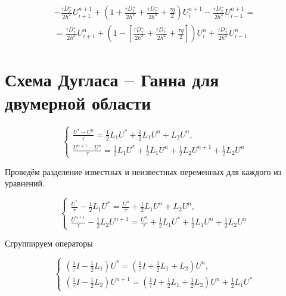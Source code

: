 \documentclass[a4paper,12pt]{article}
\begin{document}
\begin{multline*}
  - \frac{\tau D^+_x}{2h^2}U^{n+1}_{i+1} + \left(1 + \frac{\tau D^+_x}{2 h^2} + \frac{\tau D^-_x}{2 h^2} + \frac{\tau q}{2} \right) U^{n+1}_{i} - \frac{\tau D^-_x}{2h^2}U^{n+1}_{i-1}= \\
  = \frac{\tau D^+_x}{2h^2}U^{n}_{i+1} + \left(1 - \left[ \frac{\tau D^+_x}{2 h^2} + \frac{\tau D^-_x}{2 h^2} + \frac{\tau q}{2} \right] \right) U^{n}_{i} + \frac{\tau D^-_x}{2h^2}U^{n}_{i-1}
\end{multline*}


\section{Схема Дугласа -- Ганна для двумерной области}
\begin{equation}
  \begin{cases}
    \frac{U^* - U^n}{\tau} = \frac{1}{2} L_1 U^* + \frac{1}{2} L_1 U^n + L_2 U^n, \\
    \frac{U^{n+1} - U^n}{\tau} = \frac{1}{2} L_1 U^* + \frac{1}{2} L_1 U^n + \frac{1}{2} L_2 U^{n+1} + \frac{1}{2} L_2 U^n
  \end{cases}
\end{equation}

Проведём разделение известных и неизвестных переменных для каждого из уравнений.

\begin{equation}
  \begin{cases}
    \frac{U^*}{\tau} - \frac{1}{2} L_1 U^* = \frac{U^n}{\tau} + \frac{1}{2} L_1 U^n + L_2 U^n, \\
    \frac{U^{n+1}}{\tau} - \frac{1}{2} L_2 U^{n+1} = \frac{U^n}{\tau} + \frac{1}{2} L_1 U^* + \frac{1}{2} L_1 U^n + \frac{1}{2} L_2 U^n
  \end{cases}
\end{equation}


Сгруппируем операторы

\begin{equation}
  \begin{cases}
    \left( \frac{1}{\tau} I - \frac{1}{2} L_1 \right) U^* = \left( \frac{1}{\tau} I + \frac{1}{2} L_1 + L_2 \right) U^n, \\
    \left( \frac{1}{\tau} I - \frac{1}{2} L_2 \right) U^{n+1} = \left( \frac{1}{\tau} I  + \frac{1}{2} L_1 + \frac{1}{2} L_2 \right) U^n + \frac{1}{2} L_1 U^*
  \end{cases}
\end{equation}
\end{document}
